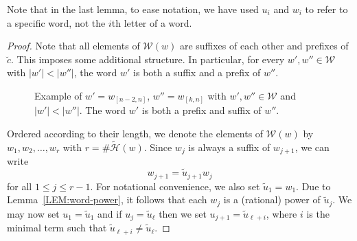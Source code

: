 \documentclass[11pt,reqno]{amsart}
\theoremstyle{plain}
\theoremstyle{definition}
\newcommand{\mc}{\mathcal}
\begin{document}
Note that in the last lemma, to ease notation, we have used $u_i$ and $w_i$ to refer to a specific word, not the $i$th letter of a word.






\begin{proof}
Note that all elements of $\mc W(w)$ are suffixes of each other and prefixes of $\breve{c}$. This imposes some additional structure. 
In particular, for every $w',w''  \in \mc W$ with $|w'| < |w''|$, the word $w'$ is both a suffix and a prefix of $w''$.
\begin{figure}[h]
   \caption{Example of $w'=w_{[n-2,n]}$, $w''=w_{[k,n]}$ with $w',w''\in \mc W$ and  $|w'|<|w''|$. The word $w'$ is both a prefix and suffix of $w''$.}
\end{figure}



Ordered according to their length, we denote the elements of $\mc W(w)$ by $w_1,w_2,\ldots,w_r$ with $r = \#  \widetilde{\mc H}(w)$.
Since $w_j$ is always a suffix of $w_{j+1}$, we can write 
\begin{equation*}
w_{j+1} =  \tilde{u}_{j+1} w_j
\end{equation*}
for all $1 \leqslant j \leqslant r-1$. For notational convenience, we also set $ \tilde{u}_1 = w_1$. 
Due to Lemma~\ref{LEM:word-power}, it follows that each $w_j$ is a (rational) power of $ \tilde{u}_j$.
We may now set $u_1=\tilde{u}_1$ and if $u_{j}=\tilde{u}_\ell$ then we set $u_{j+1}=\tilde{u}_{\ell+i}$, where $i$ is the minimal term such that $\tilde{u}_{\ell+i}\neq \tilde{u}_{\ell}$. 




\end{proof}
\end{document}

